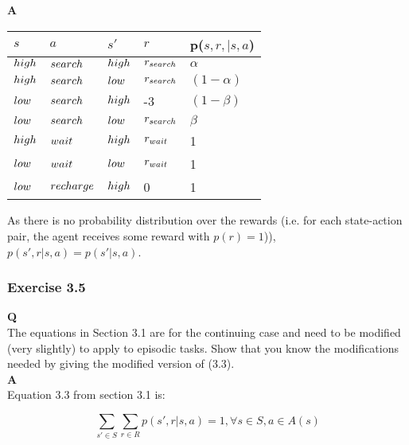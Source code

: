 \textbf{A}\\
\begin{table}[]
	\begin{tabular}{llll|l}
		\(s\) & \(a\) & \(s'\) & \(r\) & p(\(s, r, | s, a\)) \\ \hline
$\mathnormal{high}$		& $ \mathnormal{search}$     & $\mathnormal{high} $       & \(r_{\mathnormal{search}}\)       &   \(\alpha\)   \\
$\mathnormal{high}$		&  $\mathnormal{search}$     &  $\mathnormal{low}$      &   \(r_{\mathnormal{search}}\)     &  \((1-\alpha)\)                   \\
$\mathnormal{low}$		&  $\mathnormal{search}$     & $\mathnormal{high}$       & -3      & \((1-\beta)\)                    \\
$\mathnormal{low}$		&  $\mathnormal{search}$    & $\mathnormal{low} $       &  \(r_{\mathnormal{search}}\)      & \(\beta\)                     \\
$\mathnormal{high}$		&  $\mathnormal{wait}$     & $\mathnormal{high}$       & \(r_{\mathnormal{wait}}\)       &   1   \\
$\mathnormal{low}$		&  $\mathnormal{wait}$   & $\mathnormal{low}$       &  \(r_{\mathnormal{wait}}\)      &  1  \\
$\mathnormal{low}$		&  $\mathnormal{recharge}$   & $\mathnormal{high}$       &  0      &   1    \\   
	\end{tabular}
\end{table}

As there is no probability distribution over the rewards (i.e. for each state-action pair, the agent receives some reward with \(p(r) = 1\))), \(p(s', r | s, a) = p(s' | s, a)\).\\

\subsubsection{Exercise 3.5}
\textbf{Q}\\
The equations in Section 3.1 are for the continuing case and need to be modified (very slightly) to apply to episodic tasks. Show that you know the modifications needed by giving the modified version of (3.3). \\

\textbf{A}\\
Equation 3.3 from section 3.1 is:

\begin{equation}
	\sum_{s' \in S} \sum_{r \in R} p(s', r | s, a) = 1, \forall s \in S, a \in A(s)
\end{equation}


